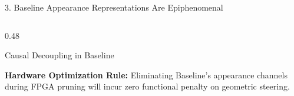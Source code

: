 \documentclass[aspectratio=169, 10pt]{beamer}
\begin{document}
\begin{frame}{3. Baseline Appearance Representations Are Epiphenomenal}
\begin{columns}[T]
\begin{column}{0.48\textwidth}
\begin{block}{Causal Decoupling in Baseline}
      \end{block}
      \scriptsize \textbf{Hardware Optimization Rule:} Eliminating Baseline's appearance channels during FPGA pruning will incur zero functional penalty on geometric steering.
    \end{column}
  \end{columns}
\end{frame}

\end{document}
